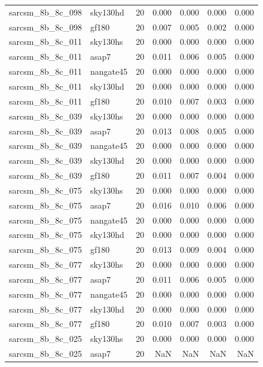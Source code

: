 \begin{tabular}{llrrrrr}
sarcsm\_8b\_8c\_098 & sky130hd & 20 & 0.000 & 0.000 & 0.000 & 0.000 \\
sarcsm\_8b\_8c\_098 & gf180 & 20 & 0.007 & 0.005 & 0.002 & 0.000 \\
sarcsm\_8b\_8c\_011 & sky130hs & 20 & 0.000 & 0.000 & 0.000 & 0.000 \\
sarcsm\_8b\_8c\_011 & asap7 & 20 & 0.011 & 0.006 & 0.005 & 0.000 \\
sarcsm\_8b\_8c\_011 & nangate45 & 20 & 0.000 & 0.000 & 0.000 & 0.000 \\
sarcsm\_8b\_8c\_011 & sky130hd & 20 & 0.000 & 0.000 & 0.000 & 0.000 \\
sarcsm\_8b\_8c\_011 & gf180 & 20 & 0.010 & 0.007 & 0.003 & 0.000 \\
sarcsm\_8b\_8c\_039 & sky130hs & 20 & 0.000 & 0.000 & 0.000 & 0.000 \\
sarcsm\_8b\_8c\_039 & asap7 & 20 & 0.013 & 0.008 & 0.005 & 0.000 \\
sarcsm\_8b\_8c\_039 & nangate45 & 20 & 0.000 & 0.000 & 0.000 & 0.000 \\
sarcsm\_8b\_8c\_039 & sky130hd & 20 & 0.000 & 0.000 & 0.000 & 0.000 \\
sarcsm\_8b\_8c\_039 & gf180 & 20 & 0.011 & 0.007 & 0.004 & 0.000 \\
sarcsm\_8b\_8c\_075 & sky130hs & 20 & 0.000 & 0.000 & 0.000 & 0.000 \\
sarcsm\_8b\_8c\_075 & asap7 & 20 & 0.016 & 0.010 & 0.006 & 0.000 \\
sarcsm\_8b\_8c\_075 & nangate45 & 20 & 0.000 & 0.000 & 0.000 & 0.000 \\
sarcsm\_8b\_8c\_075 & sky130hd & 20 & 0.000 & 0.000 & 0.000 & 0.000 \\
sarcsm\_8b\_8c\_075 & gf180 & 20 & 0.013 & 0.009 & 0.004 & 0.000 \\
sarcsm\_8b\_8c\_077 & sky130hs & 20 & 0.000 & 0.000 & 0.000 & 0.000 \\
sarcsm\_8b\_8c\_077 & asap7 & 20 & 0.011 & 0.006 & 0.005 & 0.000 \\
sarcsm\_8b\_8c\_077 & nangate45 & 20 & 0.000 & 0.000 & 0.000 & 0.000 \\
sarcsm\_8b\_8c\_077 & sky130hd & 20 & 0.000 & 0.000 & 0.000 & 0.000 \\
sarcsm\_8b\_8c\_077 & gf180 & 20 & 0.010 & 0.007 & 0.003 & 0.000 \\
sarcsm\_8b\_8c\_025 & sky130hs & 20 & 0.000 & 0.000 & 0.000 & 0.000 \\
sarcsm\_8b\_8c\_025 & asap7 & 20 & NaN & NaN & NaN & NaN \\

\end{tabular}
